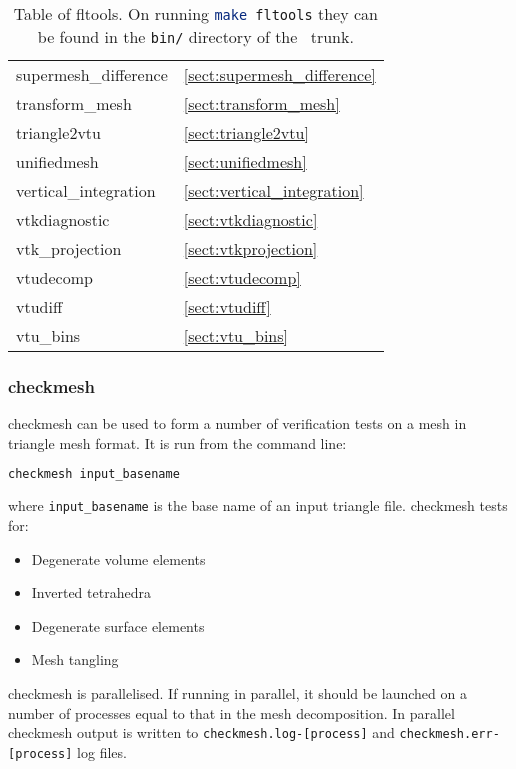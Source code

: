 \begin{table}
\begin{center}
\begin{tabular}{| l | l |}
	supermesh\_difference			& \ref{sect:supermesh_difference} 	\\
	transform\_mesh				& \ref{sect:transform_mesh}		\\
	triangle2vtu				& \ref{sect:triangle2vtu}		\\
	unifiedmesh				& \ref{sect:unifiedmesh} 		\\	
	vertical\_integration			& \ref{sect:vertical_integration} 	\\
	vtkdiagnostic				& \ref{sect:vtkdiagnostic}		\\
	vtk\_projection				& \ref{sect:vtkprojection}		\\
	vtudecomp				& \ref{sect:vtudecomp}			\\
	vtudiff					& \ref{sect:vtudiff}			\\
	vtu\_bins           			& \ref{sect:vtu_bins}			\\
    \hline
  \end{tabular}
\end{center}
\caption[Table of fltools]{Table of fltools. On running \lstinline[language = bash]+make fltools+ they can be found in the \lstinline[language = bash]+bin/+ directory of the \fluidity\ trunk.}
\label{tab:fltools}
\end{table}


\subsubsection{checkmesh}
\label{sect:checkmesh}
checkmesh can be used to form a number of verification tests on a mesh in triangle mesh
format. It is run from the command line:
\begin{lstlisting}[language = Bash]
checkmesh input_basename
\end{lstlisting}
where \lstinline[language = Bash]+input_basename+ is the base name of an input triangle file. checkmesh tests for:
\begin{itemize}
\item Degenerate volume elements
\item Inverted tetrahedra
\item Degenerate surface elements
\item Mesh tangling
\end{itemize}

checkmesh is parallelised. If running in parallel, it should be launched on a number of processes equal to that in the mesh decomposition. In parallel checkmesh output is written to
\lstinline[language = Bash]+checkmesh.log-[process]+ and \lstinline[language = Bash]+checkmesh.err-[process]+ log files.

